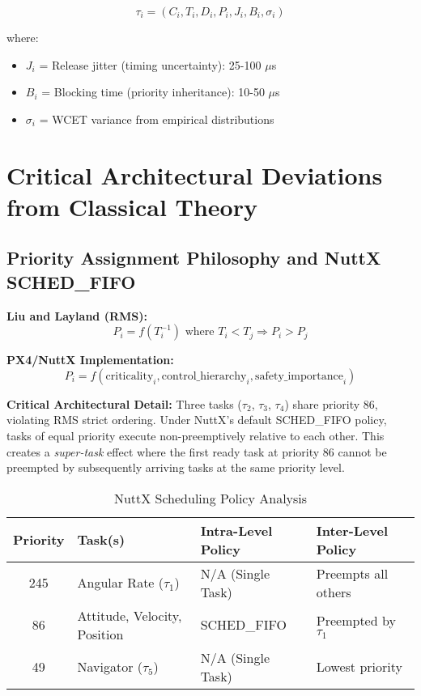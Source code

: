 \documentclass[12pt,a4paper]{article}
\begin{document}
\begin{equation}
\tau_i = (C_i, T_i, D_i, P_i, J_i, B_i, \sigma_i)
\end{equation}

where:
\begin{itemize}
\item $J_i$ = Release jitter (timing uncertainty): 25-100 $\mu$s
\item $B_i$ = Blocking time (priority inheritance): 10-50 $\mu$s
\item $\sigma_i$ = WCET variance from empirical distributions
\end{itemize}

\section{Critical Architectural Deviations from Classical Theory}

\subsection{Priority Assignment Philosophy and NuttX SCHED\_FIFO}

\textbf{Liu and Layland (RMS):}
\begin{equation}
P_i = f(T_i^{-1}) \text{ where } T_i < T_j \Rightarrow P_i > P_j
\end{equation}

\textbf{PX4/NuttX Implementation:}
\begin{equation}
P_i = f(\text{criticality}_i, \text{control\_hierarchy}_i, \text{safety\_importance}_i)
\end{equation}

\textbf{Critical Architectural Detail:} Three tasks ($\tau_2$, $\tau_3$, $\tau_4$) share priority 86, violating RMS strict ordering. Under NuttX's default SCHED\_FIFO policy, tasks of equal priority execute non-preemptively relative to each other. This creates a \emph{super-task} effect where the first ready task at priority 86 cannot be preempted by subsequently arriving tasks at the same priority level.

\begin{table}[H]
\centering
\begin{tabular}{|c|l|l|l|}
\hline
\textbf{Priority} & \textbf{Task(s)} & \textbf{Intra-Level Policy} & \textbf{Inter-Level Policy} \\
\hline
245 & Angular Rate ($\tau_1$) & N/A (Single Task) & Preempts all others \\
86 & Attitude, Velocity, Position & SCHED\_FIFO & Preempted by $\tau_1$ \\
49 & Navigator ($\tau_5$) & N/A (Single Task) & Lowest priority \\
\hline
\end{tabular}
\caption{NuttX Scheduling Policy Analysis}
\end{table}
\end{document}
